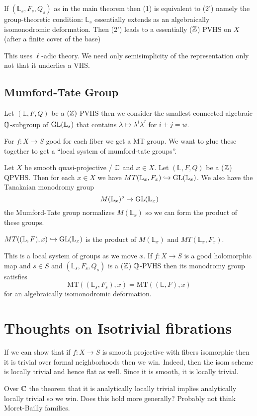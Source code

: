 \documentclass[12pt]{article}
\newcommand{\LL}{\mathbb{L}}
\newcommand{\MT}{\mathrm{MT}}
\begin{document}
\begin{theorem}
If $(\LL_s, F_s, Q_s)$ as in the main theorem then (1) is equivalent to (2') namely the group-theoretic condition: $\LL_s$ essentially extends as an algebraically isomonodromic deformation. Then (2') leads to a essentially ($\mathbb{Z}$) PVHS on $X$ (after a finite \etale cover of the base) 
\end{theorem}

This uses $\ell$-adic theory. We need only semisimplicity of the representation only not that it underlies a VHS. 

\subsection{Mumford-Tate Group}

Let $(\LL, F, Q)$ be a $(\mathbb{Z})$ PVHS then we consider the smallest connected algebraic $\mathbb{Q}$-subgroup of $\GL(\LL_s)$ that contains $\lambda \mapsto \lambda^i \bar{\lambda}^{j}$ for $i + j = w$. 

For $f : X \to S$ good for each fiber we get a MT group. We want to glue these together to get a ``local system of mumford-tate groups''. 

Let $X$ be smooth quasi-projective / $\mathbb{C}$ and $x \in X$. Let $(\LL, F, Q)$ be a ($\mathbb{Z}$) QPVHS. Then for each $x \in X$ we have $MT(\LL_x, F_x) \embed \GL(\LL_x)$. We also have the Tanakaian monodromy group
\[ M(\LL_x)^\circ \to \GL(\LL_x) \]
the Mumford-Tate group normalizes $M(\LL_x)$ so we can form the product of these groups. 

\begin{defn}
$MT((\LL, F), x) \embed \GL(\LL_x)$ is the product of $M(\LL_x)$ and $MT(\LL_x, F_x)$. 
\end{defn}

\begin{theorem}
This is a local system of groups as we move $x$. If $f : X \to S$ is a good holomorphic map and $s \in S$ and $(\LL_s, F_s, Q_s)$ is a ($\mathbb{Z}$) $\mathbb{Q}$-PVHS then its monodromy group satisfies
\[ \MT( (\LL_s, F_s), x) = \MT( (\LL, F), x) \]
for an algebraically isomonodromic deformation. 
\end{theorem}

\section{Thoughts on Isotrivial fibrations}

If we can show that if $f : X \to S$ is smooth projective with fibers isomorphic then it is trivial over formal neighborhoods then we win. Indeed, then the isom scheme is locally trivial and hence flat as well. Since it is smooth, it is \etale locally trivial. 
\par 
Over $\mathbb{C}$ the theorem that it is analytically locally trivial implies analytically locally trivial so we win. Does this hold more generally? Probably not think Moret-Bailly families. 
\end{document}
